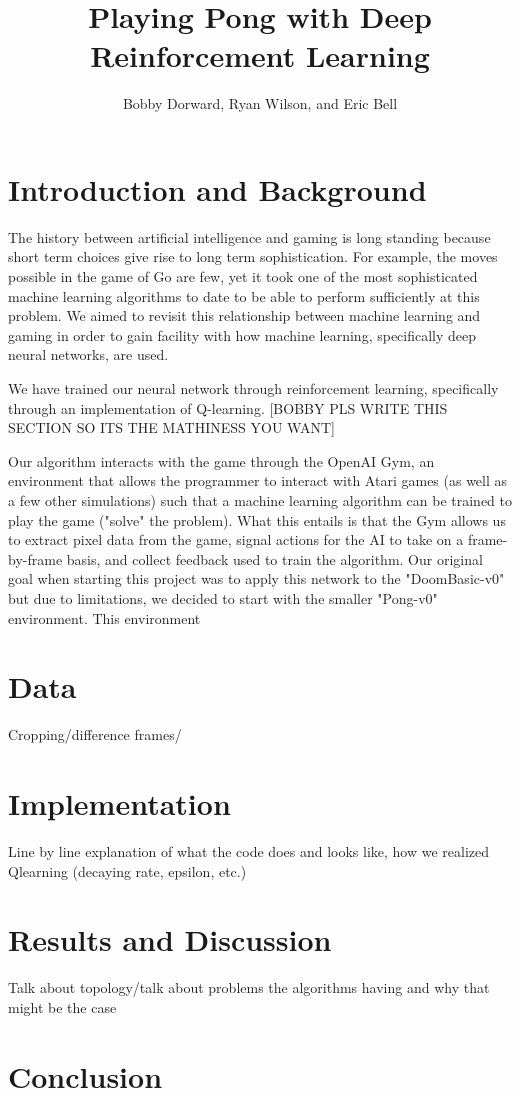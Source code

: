 \documentclass[12pt]{article}
\theoremstyle{plain}
\theoremstyle{definition}
\theoremstyle{remark}
\theoremstyle{plain}
\begin{document}
\title{Playing Pong with Deep Reinforcement Learning}
\author{Bobby Dorward, Ryan Wilson, and Eric Bell}
\maketitle

\section{Introduction and Background}
\par 
The history between artificial intelligence and gaming is long standing because short term choices give rise to long term sophistication.  For example, the moves possible in the game of Go are few, yet it took one of the most sophisticated machine learning algorithms to date to be able to perform sufficiently at this problem.  We aimed to revisit this relationship between machine learning and gaming in order to gain  facility with how machine learning, specifically deep neural networks, are used.
\par
We have trained our neural network through reinforcement learning, specifically through an implementation of Q-learning. [BOBBY PLS WRITE THIS SECTION SO ITS THE MATHINESS YOU WANT]
\par
Our algorithm interacts with the game through the OpenAI Gym, an environment that allows the programmer to interact with Atari games (as well as a few other simulations) such that a machine learning algorithm can be trained to play the game ("solve" the problem).  What this entails is that the Gym allows us to extract pixel data from the game, signal actions for the AI to take on a frame-by-frame basis, and collect feedback used to train the algorithm.  Our original goal when starting this project was to apply this network to the "DoomBasic-v0" but due to limitations, we decided to start with the smaller "Pong-v0" environment.  This environment 
\section{Data}
Cropping/difference frames/
\section{Implementation}
Line by line explanation of what the code does and looks like, how we realized Qlearning (decaying rate, epsilon, etc.)
\section{Results and Discussion}
Talk about topology/talk about problems the algorithms having and why that might be the case
\section{Conclusion}
\end{document}
